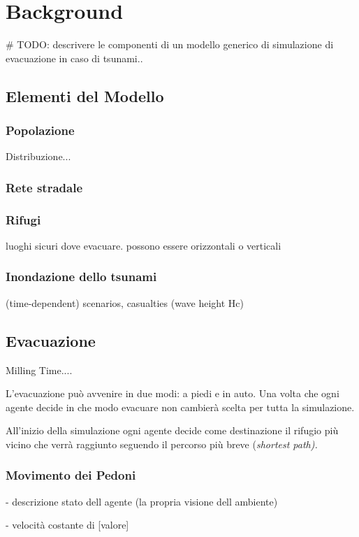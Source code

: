 \section{Background}
\# TODO: descrivere le componenti di un modello generico di simulazione di evacuazione in caso di tsunami..

\subsection{Elementi del Modello}

\subsubsection{Popolazione}
Distribuzione... 

\subsubsection{Rete stradale}

\subsubsection{Rifugi}
luoghi sicuri dove evacuare. possono essere orizzontali o verticali

\subsubsection{Inondazione dello tsunami}
(time-dependent) scenarios, casualties (wave height Hc) 

\subsection{Evacuazione}
Milling Time....

L'evacuazione può avvenire in due modi: a piedi e in auto. Una volta che ogni agente decide
in che modo evacuare non cambierà scelta per tutta la simulazione.

All'inizio della simulazione ogni agente decide come destinazione il rifugio più vicino 
che verrà raggiunto seguendo il percorso più breve (\it{shortest path}).


\subsubsection{Movimento dei Pedoni}
- descrizione stato dell agente (la propria visione dell ambiente)

- velocità costante di [valore]

